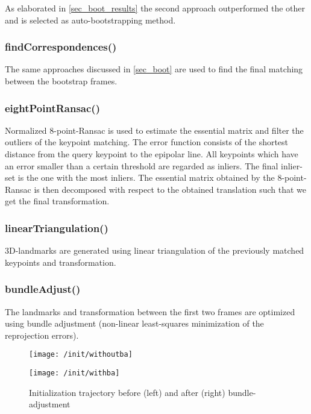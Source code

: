 As elaborated in \cref{sec_boot_results} the second approach outperformed the other and is selected as auto-bootstrapping method.


\subsubsection{findCorrespondences()}
The same approaches discussed in \cref{sec_boot} are used to find the final matching between the bootstrap frames.


\subsubsection{eightPointRansac()}
Normalized 8-point-Ransac is used to estimate the essential matrix and filter the outliers of the keypoint matching.
The error function consists of the shortest distance from the query keypoint to the epipolar line. All keypoints which have an error smaller than a certain threshold are regarded as inliers. The final inlier-set is the one with the most inliers.
The essential matrix obtained by the 8-point-Ransac is then decomposed with respect to the obtained translation such that we get the final transformation.

\subsubsection{linearTriangulation()}
3D-landmarks are generated using linear triangulation of the previously matched keypoints and transformation.

\subsubsection{bundleAdjust()}
The landmarks and transformation between the first two frames are optimized using bundle adjustment (non-linear least-squares minimization of the reprojection errors).
\begin{figure}[ht]
	\centering
	\begin{minipage}{.4\textwidth}
		\centering
		\texttt{[image: /init/withoutba]}
	\end{minipage}
	\begin{minipage}{.4\textwidth}
		\centering
		\texttt{[image: /init/withba]}
	\end{minipage}%
	\caption{Initialization trajectory before (left) and after (right) bundle-adjustment}
\end{figure}


